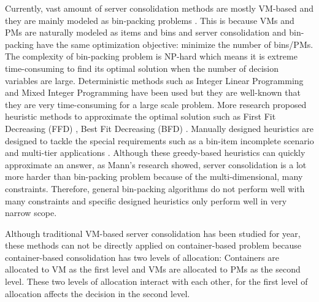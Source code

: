 Currently, vast amount of server consolidation methods are mostly VM-based and they are mainly modeled as bin-packing problems \cite{Mann:2015ua}. This is because VMs and PMs are naturally modeled as items and bins and server consolidation and bin-packing have the same optimization objective: minimize the number of bins/PMs. The complexity of bin-packing problem is NP-hard which means it is extreme time-consuming to find its optimal solution when the number of decision variables are large. Deterministic methods such as Integer Linear Programming \cite{Speitkamp:2010ck} and Mixed
Integer Programming \cite{Wang:2016eh} have been used but they are well-known that they are very time-consuming for a large scale problem. 
More research proposed heuristic methods to approximate the optimal solution such as 
First Fit Decreasing (FFD) \cite{Panigrahy:2011wk}, Best Fit Decreasing (BFD) \cite{Beloglazov:2012ji}.
Manually designed heuristics are designed to tackle the special requirements such 
as a bin-item incomplete scenario \cite{Gupta:2008ul} and multi-tier applications \cite{Jung:2008vb, Li:2009wf}. Although these greedy-based heuristics can quickly approximate an answer,  as Mann's research \cite{Mann:2015ua} showed, server consolidation is a lot more harder than bin-packing problem because of the multi-dimensional, many constraints. Therefore, general bin-packing algorithms do not perform well with many constraints and specific designed heuristics only perform well in very narrow scope.

Although traditional VM-based server consolidation has been studied for year, these methods can not be directly applied on container-based problem because container-based consolidation has two levels of allocation: Containers are allocated to VM as the first level and VMs are allocated to PMs as the second level. These two levels of allocation interact with each other, for the first level of allocation affects the decision in the second level.


